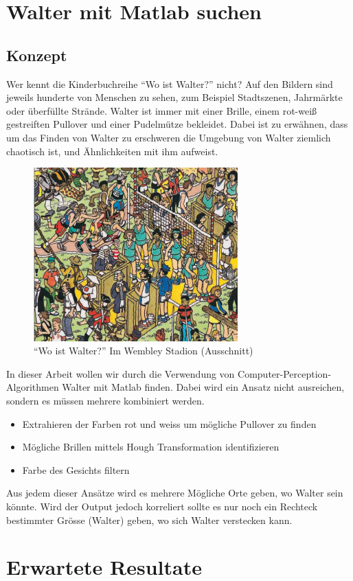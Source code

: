 \documentclass[paper=a4,fontsize=12pt]{scrartcl}
\begin{document}
\section*{Walter mit Matlab suchen}
\subsection*{Konzept}
Wer kennt die Kinderbuchreihe ``Wo ist Walter?'' nicht? Auf den Bildern sind jeweils hunderte von Menschen zu sehen, zum Beispiel Stadtszenen, Jahrmärkte oder überfüllte Strände. Walter ist immer mit einer Brille, einem rot-weiß gestreiften Pullover und einer Pudelmütze bekleidet. Dabei ist zu erwähnen, dass um das Finden von Walter zu erschweren die Umgebung von Walter ziemlich chaotisch ist, und Ähnlichkeiten mit ihm aufweist. 
\begin{figure}[htbp] 
  \centering
     \includegraphics[width=0.7\textwidth]{img/Wally.png}
  \caption{``Wo ist Walter?'' Im Wembley Stadion (Ausschnitt)}
  \label{fig:Bild1}
\end{figure}

In dieser Arbeit wollen wir durch die Verwendung von Computer-Perception-Algorithmen Walter mit Matlab finden. Dabei wird ein Ansatz nicht ausreichen, sondern es müssen mehrere kombiniert werden.
\begin{itemize}
 \item Extrahieren der Farben rot und weiss um mögliche Pullover zu finden
 \item Mögliche Brillen mittels Hough Transformation identifizieren
 \item Farbe des Gesichts filtern
\end{itemize}
Aus jedem dieser Ansätze wird es mehrere Mögliche Orte geben, wo Walter sein könnte. Wird der Output jedoch korreliert sollte es nur noch ein Rechteck bestimmter Grösse (Walter) geben, wo sich Walter verstecken kann. 


\section*{Erwartete Resultate}
\end{document}
